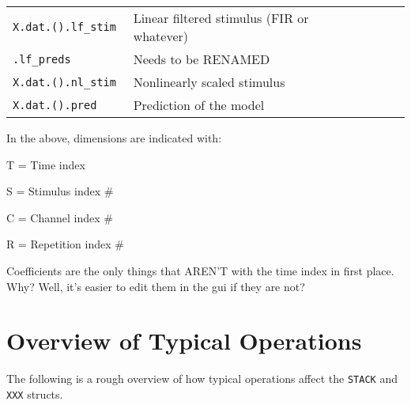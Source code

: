 \documentclass[letterpaper]{report}
\newcommand{\matlab}[1]{\texttt{#1}}
\begin{document}
\begin{tabular}{|l|l|l|l|l|}
\matlab{X{}.dat.().lf\_stim        } & Linear filtered stimulus (FIR or whatever)                   &         &                              &   \\
\matlab{.lf\_preds                 } & Needs to be RENAMED                                          &         &                              &   \\
\matlab{X{}.dat.().nl\_stim        } & Nonlinearly scaled stimulus                                  &         &                              &   \\
\matlab{X{}.dat.().pred           } & Prediction of the model &         &                              &   \\
\end{tabular}

In the above, dimensions are indicated with:

\begin{description}
  \item {T} = Time index 
  \item {S} = Stimulus index \#
  \item {C} = Channel index \#
  \item {R} = Repetition index \#
\end{description}

Coefficients are the only things that AREN'T with the time index in first place. Why? Well, it's easier to edit them in the gui if they are not?

\section{Overview of Typical Operations}

The following is a rough overview of how typical operations affect the \matlab{STACK} and \matlab{XXX} structs. 
\end{document}
